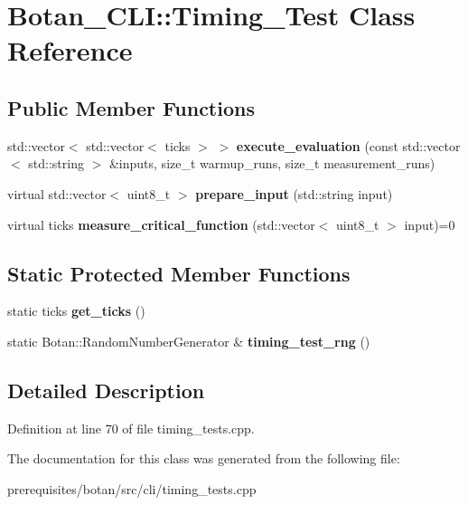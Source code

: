 \hypertarget{class_botan___c_l_i_1_1_timing___test}{}\section{Botan\+\_\+\+C\+LI\+:\+:Timing\+\_\+\+Test Class Reference}
\label{class_botan___c_l_i_1_1_timing___test}
\subsection*{Public Member Functions}
\begin{DoxyCompactItemize}
\item 
\mbox{\label{class_botan___c_l_i_1_1_timing___test_a15748dea1b7cc9f6624bd203346b30b0}} 
std\+::vector$<$ std\+::vector$<$ ticks $>$ $>$ {\bfseries execute\+\_\+evaluation} (const std\+::vector$<$ std\+::string $>$ \&inputs, size\+\_\+t warmup\+\_\+runs, size\+\_\+t measurement\+\_\+runs)
\item 
\mbox{\label{class_botan___c_l_i_1_1_timing___test_acb56e74bbeafc7a5664f0a7b6d9d70b3}} 
virtual std\+::vector$<$ uint8\+\_\+t $>$ {\bfseries prepare\+\_\+input} (std\+::string input)
\item 
\mbox{\label{class_botan___c_l_i_1_1_timing___test_a5b82f9db7736ae632be77f720c032811}} 
virtual ticks {\bfseries measure\+\_\+critical\+\_\+function} (std\+::vector$<$ uint8\+\_\+t $>$ input)=0
\end{DoxyCompactItemize}
\subsection*{Static Protected Member Functions}
\begin{DoxyCompactItemize}
\item 
\mbox{\label{class_botan___c_l_i_1_1_timing___test_a9344c2d816f07aadd18821fa394d27eb}} 
static ticks {\bfseries get\+\_\+ticks} ()
\item 
\mbox{\label{class_botan___c_l_i_1_1_timing___test_ac1099fbb4127fb23bec9d4149c4502a8}} 
static Botan\+::\+Random\+Number\+Generator \& {\bfseries timing\+\_\+test\+\_\+rng} ()
\end{DoxyCompactItemize}


\subsection{Detailed Description}


Definition at line 70 of file timing\+\_\+tests.\+cpp.



The documentation for this class was generated from the following file\+:\begin{DoxyCompactItemize}
\item 
prerequisites/botan/src/cli/timing\+\_\+tests.\+cpp\end{DoxyCompactItemize}
